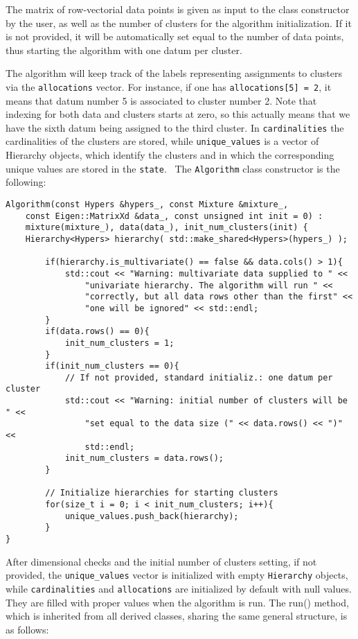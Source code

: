 The matrix of row-vectorial data points is given as input to the class constructor by the user, as well as the number of clusters for the algorithm initialization. If it is not provided, it will be automatically set equal to the number of data points, thus starting the algorithm with one datum per cluster.

The algorithm will keep track of the labels representing assignments to clusters via the \verb|allocations| vector.
For instance, if one has \verb|allocations[5] = 2|, it means that datum number 5 is associated to cluster number 2.
Note that indexing for both data and clusters starts at zero, so this actually means that we have the sixth datum being assigned to the third cluster. 
In \verb|cardinalities| the cardinalities of the clusters are stored, while \verb|unique_values| is a vector of Hierarchy objects, which identify the clusters and in which the corresponding unique values are stored in the \verb|state|. \
The \verb|Algorithm| class constructor is the following:

\begin{verbatim}
Algorithm(const Hypers &hypers_, const Mixture &mixture_,
	const Eigen::MatrixXd &data_, const unsigned int init = 0) :
    mixture(mixture_), data(data_), init_num_clusters(init) {
    Hierarchy<Hypers> hierarchy( std::make_shared<Hypers>(hypers_) );

    	if(hierarchy.is_multivariate() == false && data.cols() > 1){
        	std::cout << "Warning: multivariate data supplied to " <<
            	"univariate hierarchy. The algorithm will run " <<
                "correctly, but all data rows other than the first" <<
                "one will be ignored" << std::endl;
        }
        if(data.rows() == 0){
            init_num_clusters = 1;            
        }
        if(init_num_clusters == 0){
            // If not provided, standard initializ.: one datum per cluster
            std::cout << "Warning: initial number of clusters will be " <<
                "set equal to the data size (" << data.rows() << ")" <<
                std::endl;
            init_num_clusters = data.rows();
        }

        // Initialize hierarchies for starting clusters
        for(size_t i = 0; i < init_num_clusters; i++){
            unique_values.push_back(hierarchy);
        }
}

 \end{verbatim}
After dimensional checks and the initial number of clusters setting, if not provided, the \verb|unique_values| vector is initialized with empty \verb|Hierarchy| objects, while \verb|cardinalities| and \verb|allocations| are initialized by default with null values. They are filled with proper values when the algorithm is run.
The run() method, which is inherited from all derived classes, sharing the same general structure, is as follows:

